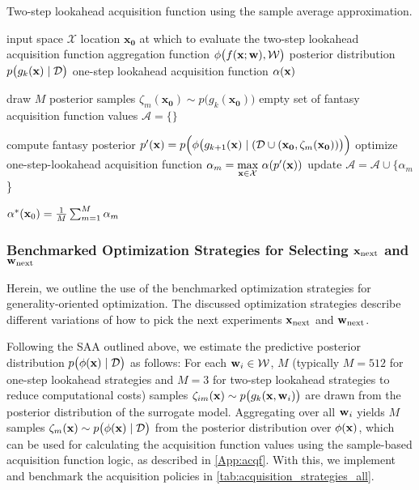 \begin{algorithm} 

\caption{
Two-step lookahead acquisition function using the sample average approximation.}\label{alg:two_step}

\begin{algorithmic}[1]
\Require
\Statex input space $\mathcal{X}$
\Statex location $\mathbf{x_0}$ at which to evaluate the two-step lookahead acquisition function
\Statex aggregation function $\phi\big(f({\mathbf{x}}; {\mathbf{w}}), \mathcal{W}\big)$
\Statex posterior distribution  $p\big(g_k ({\mathbf{x}}) \mid \mathcal{D}\big)$
\Statex one-step lookahead acquisition function $\alpha({\mathbf{x}})$

\vspace{0.2cm}

\State draw $M$ posterior samples $\zeta_m(\mathbf{x_0}) \sim p\big(g_k(\mathbf{x_0})\big)$
\State empty set of fantasy acquisition function values $\mathcal{A} = \{\}$


 \State compute fantasy posterior $p'({\mathbf{x}}) = p\Big(\phi\big(g_{k+1} ({\mathbf{x}}) \mid (\mathcal{D} \cup (\mathbf{x_0}, \zeta_m(\mathbf{x_0}))\big)\Big)$
 \State optimize one-step-lookahead acquisition function $\alpha_m = \underset{{\mathbf{x}} \in \mathcal{X}}{\text{max}} \ \alpha(p'({\mathbf{x}}))$
 \State update $\mathcal{A} = \mathcal{A} \cup \{\alpha_m$\}

\EndFor
\vspace{0.2cm}
\State \Return $\alpha^{*}({\mathbf{x}}_0) = \frac{1}{M} \sum_{m=1}^M \alpha_m$

\end{algorithmic}
\end{algorithm}

\subsubsection{Benchmarked Optimization Strategies for Selecting ${\mathbf{x}}_{\text{next}}$ and ${\mathbf{w}}_{\text{next}}$} \label{subsubsec:policies}

Herein, we outline the use of the benchmarked optimization strategies for generality-oriented optimization. The discussed optimization strategies describe different variations of how to pick the next experiments ${\mathbf{x}}_{\text{next}}$ and ${\mathbf{w}}_{\text{next}}$. 

Following the SAA \citep{balandat_botorch_2020} outlined above, we estimate the predictive posterior distribution $p\big(\phi ({\mathbf{x}}) \mid \mathcal{D}\big)$ as follows: 
For each ${\mathbf{w}}_i \in \mathcal{W}$, $M$ (typically $M = 512$ for one-step lookahead strategies and $M = 3$ for two-step lookahead strategies to reduce computational costs) samples $\zeta_{im}({\mathbf{x}}) \sim p\big(g_k({\mathbf{x}}, {\mathbf{w}}_i)\big)$ are drawn from the posterior distribution of the surrogate model.
Aggregating over all ${\mathbf{w}}_i$ yields $M$ samples $\zeta_m ({\mathbf{x}}) \sim p\big(\phi ({\mathbf{x}}) \mid \mathcal{D}\big)$ from the posterior distribution over $\phi({\mathbf{x}})$, which can be used for calculating the acquisition function values using the sample-based acquisition function logic, as described in \cref{App:acqf}.
With this, we implement and benchmark the acquisition policies in \cref{tab:acquisition_strategies_all}.

